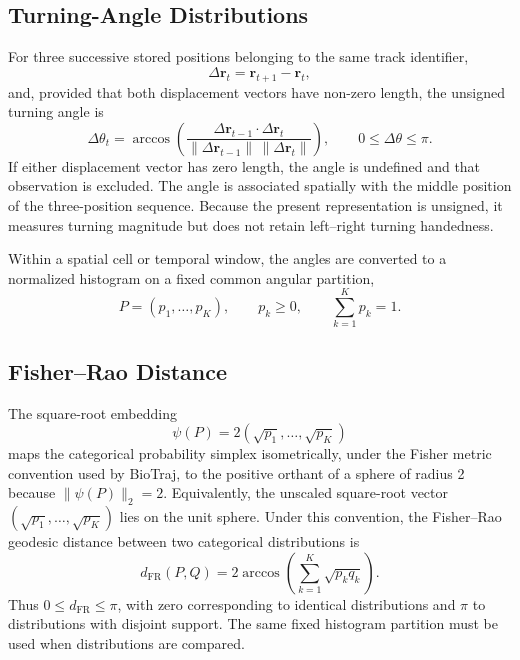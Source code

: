\documentclass[11pt,a4paper]{article}
\begin{document}
\subsection{Turning-Angle Distributions}
For three successive stored positions belonging to the same track identifier,
\begin{equation}
\Delta\mathbf r_t=\mathbf r_{t+1}-\mathbf r_t,
\end{equation}
and, provided that both displacement vectors have non-zero length, the unsigned turning angle is
\begin{equation}
\Delta\theta_t=\arccos\left(
\frac{\Delta\mathbf r_{t-1}\cdot\Delta\mathbf r_t}
{\|\Delta\mathbf r_{t-1}\|\,\|\Delta\mathbf r_t\|}
\right),\qquad 0\leq\Delta\theta\leq\pi.
\end{equation}
If either displacement vector has zero length, the angle is undefined and that observation is excluded. The angle is associated spatially with the middle position of the three-position sequence. Because the present representation is unsigned, it measures turning magnitude but does not retain left--right turning handedness.

Within a spatial cell or temporal window, the angles are converted to a normalized histogram on a fixed common angular partition,
\begin{equation}
P=(p_1,\ldots,p_K),\qquad p_k\geq0,\qquad \sum_{k=1}^{K}p_k=1.
\end{equation}

\subsection{Fisher--Rao Distance}
The square-root embedding
\begin{equation}
\psi(P)=2\left(\sqrt{p_1},\ldots,\sqrt{p_K}\right)
\end{equation}
maps the categorical probability simplex isometrically, under the Fisher
metric convention used by BioTraj, to the positive orthant of a sphere of
radius 2 because $\|\psi(P)\|_2=2$. Equivalently, the unscaled square-root
vector $(\sqrt{p_1},\ldots,\sqrt{p_K})$ lies on the unit sphere. Under this
convention, the Fisher--Rao geodesic distance between two categorical
distributions is
\begin{equation}
d_{\mathrm{FR}}(P,Q)=
2\arccos\left(\sum_{k=1}^{K}\sqrt{p_kq_k}\right).
\end{equation}
Thus $0\leq d_{\mathrm{FR}}\leq\pi$, with zero corresponding to identical
distributions and $\pi$ to distributions with disjoint support. The same
fixed histogram partition must be used when distributions are compared.
\end{document}
